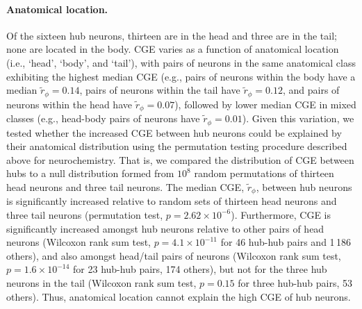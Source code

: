 \documentclass[10pt,letterpaper]{article}
\begin{document}
{\paragraph{Anatomical location.}
Of the sixteen hub neurons, thirteen are in the head and three are in the tail; none are located in the body.
CGE varies as a function of anatomical location (i.e., `head', `body', and `tail'), with pairs of neurons in the same anatomical class exhibiting the highest median CGE (e.g., pairs of neurons within the body have a median $\tilde{r}_\phi = 0.14$, pairs of neurons within the tail have $\tilde{r}_\phi = 0.12$, and pairs of neurons within the head have $\tilde{r}_\phi = 0.07$), followed by lower median CGE in mixed classes (e.g., head-body pairs of neurons have $\tilde{r}_\phi = 0.01$).
Given this variation, we tested whether the increased CGE between hub neurons could be explained by their anatomical distribution using the permutation testing procedure described above for neurochemistry.
That is, we compared the distribution of CGE between hubs to a null distribution formed from $10^8$ random permutations of thirteen head neurons and three tail neurons.
The median CGE, $\tilde{r}_\phi$, between hub neurons is significantly increased relative to random sets of thirteen head neurons and three tail neurons (permutation test, $p = 2.62\times10^{-6}$).
Furthermore, CGE is significantly increased amongst hub neurons relative to other pairs of head neurons (Wilcoxon rank sum test, $p = 4.1 \times 10^{-11}$ for 46 hub-hub pairs and 1\,186 others),
and also amongst head/tail pairs of neurons (Wilcoxon rank sum test, $p = 1.6 \times 10^{-14}$ for 23 hub-hub pairs, 174 others),
but not for the three hub neurons in the tail (Wilcoxon rank sum test, $p = 0.15$ for three hub-hub pairs, 53 others).
Thus, anatomical location cannot explain the high CGE of hub neurons.

}
\end{document}
